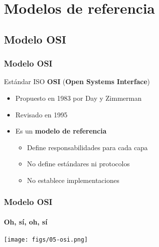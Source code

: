 \documentclass[letter]{beamer}
\begin{document}
\section{Modelos de referencia}

\subsection{Modelo OSI}

\begin{frame}
  \frametitle{Modelo OSI}

  Estándar ISO {\bf OSI} ({\bf Open Systems Interface})
  \begin{itemize}
    \item Propuesto en 1983 por Day y Zimmerman
    \item Revisado en 1995
    \item Es un {\bf modelo de referencia}
      \begin{itemize}
        \item Define responsabilidades para cada capa
        \item No define estándares ni protocolos
        \item No establece implementaciones
      \end{itemize}
  \end{itemize}
  
\end{frame}
\begin{frame}
  \frametitle{Modelo OSI}
  \framesubtitle{Oh, sí, oh, sí}

  \begin{center}
    \texttt{[image: figs/05-osi.png]}
  \end{center}
  
\end{frame}
\end{document}
